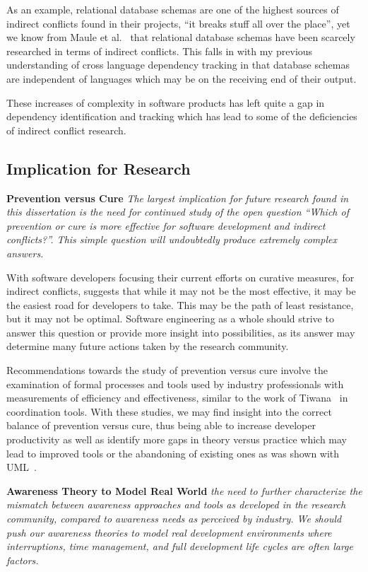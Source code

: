 As an example, relational database schemas are one of the highest sources of indirect
conflicts found in their projects, ``it breaks stuff all over the place'',
yet we know from Maule et al.~\cite{Maule:2008:IAD} that relational database schemas have 
been scarcely researched in terms of indirect conflicts. This falls in with my previous understanding of cross language
dependency tracking in that database schemas are independent of languages which may be on the receiving end of their output.

These increases of complexity in software products has left quite a gap in dependency identification and tracking which 
has lead to some of the deficiencies of indirect conflict research.


\subsection{Implication for Research}
\label{sec:implr}

\textbf{Prevention versus Cure} \textit{The largest implication for future research found in this dissertation is the need for continued study of the open question
``Which of prevention or cure is more effective for software development and indirect conflicts?''. This simple question will undoubtedly 
produce extremely complex answers.}

With software developers focusing their current efforts on curative measures, for
indirect conflicts, suggests
that while it may not be the most effective, it may be the easiest road for developers to take. This may be the path of
least resistance, but it may not be optimal. Software engineering as a whole should strive to answer this question or
provide more insight into possibilities, as its answer may determine many future actions taken by the research community.

Recommendations towards the study of prevention versus cure involve the examination of formal processes and tools used
by industry professionals with measurements of efficiency and effectiveness, similar to the work of
Tiwana~\cite{Tiwana:2008:ICD} in coordination tools. With these studies, we may find insight into the correct balance
of prevention versus cure, thus being able to increase developer productivity as well as identify more gaps in theory 
versus practice which may lead to improved tools or the abandoning of existing ones as was shown with UML~\cite{Petre:2013:UP}.

\textbf{Awareness Theory to Model Real World} \textit{the need to further characterize the
mismatch between awareness approaches and tools as developed in the research community, compared to awareness needs as perceived
by industry. We should push our awareness theories to model real development
environments where interruptions, time management, and full development life cycles are often large factors.}

